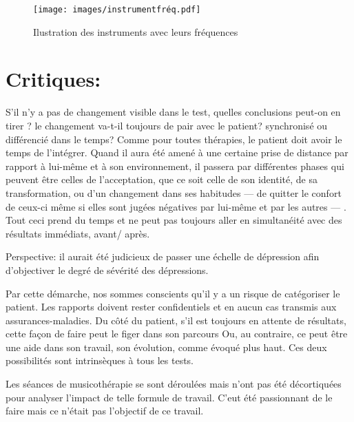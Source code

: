       \begin{figure}
	\centering
	\texttt{[image: images/instrumentfréq.pdf]}
	\caption[Les instruments et leurs fréquences]{Ilustration des instruments avec leurs fréquences}
       
	\label{instrumentfreq}
\end{figure}
  





\section{Critiques: }
S'il n'y a pas de changement visible dans le test, quelles conclusions
peut-on en tirer ? le changement va-t-il toujours de pair avec le
patient? synchronisé ou différencié dans le temps?
Comme pour toutes thérapies, le patient doit avoir le temps de l'intégrer. Quand
il aura été amené à une certaine prise de distance par rapport à
lui-même et à son environnement, il passera par différentes phases qui peuvent être celles de l'acceptation, que ce soit celle de son identité, de sa transformation, ou d'un changement dans ses habitudes --- de quitter le confort de ceux-ci même si elles sont jugées négatives par lui-même et par les autres --- . Tout ceci prend du temps et ne peut pas 
toujours  aller en simultanéité avec des résultats immédiats, avant/ après.

Perspective: il aurait été judicieux de passer une échelle de
     dépression afin d'objectiver le degré de sévérité des
     dépressions.




Par cette démarche, nos sommes conscients qu'il y a un risque de catégoriser le patient. Les
rapports doivent rester confidentiels et en aucun cas transmis
aux assurances-maladies.
Du côté du patient, s'il est toujours en
attente de résultats, cette façon de faire peut le figer dans son
parcours  Ou, au contraire, ce peut être une aide dans son travail,
son évolution, comme évoqué plus haut. Ces deux possibilités sont
intrinsèques à tous les tests.

Les séances de musicothérapie se sont déroulées mais  n'ont pas été
décortiquées pour analyser l'impact de telle formule de travail. C'eut
été passionnant de le faire mais ce n'était pas l'objectif de ce travail.		
        
 

  
